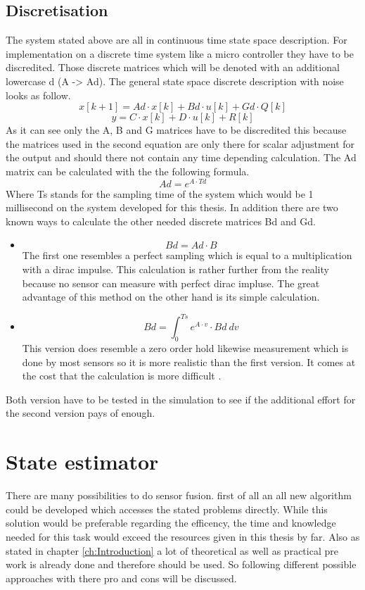   \subsection{Discretisation}
  The system stated above are all in continuous time state space description. 
  For implementation on a discrete time system like a micro controller they have to be discredited.
  Those discrete matrices which will be denoted with an additional lowercase d (A -> Ad).
  The general state space discrete description with noise looks as follow.
  $$ x[k+1] = Ad\cdot x[k] + Bd\cdot u[k] + Gd\cdot Q[k] $$
  $$ y = C \cdot x[k] + D\cdot u[k] + R[k] $$
  As it can see only the A, B and G matrices have to be discredited this because 
  the matrices used in the second equation are only there for scalar adjustment for the output
  and should there not contain any time depending calculation.
  The Ad matrix can be calculated with the the following formula.
  $$ Ad = e^{A\cdot Td}$$
  Where Ts stands for the sampling time of the system which would be 1 millisecond on the system developed for this thesis.
  In addition there are two known ways to calculate the other needed discrete matrices Bd and Gd.
  \begin{itemize}
   \item $$ Bd = Ad \cdot B $$
	 The first one resembles a perfect sampling which is equal to a multiplication with a dirac impulse.
	 This calculation is rather further from the reality because no sensor can measure with perfect dirac impluse.
	 The great advantage of this method on the other hand is its simple calculation.
   \item $$ Bd = \int_0^{Ts} e^{A\cdot v}\cdot Bd \ dv $$
	 This version does resemble a zero order hold likewise measurement which is done by most sensors so it is more realistic than the first version.
	 It comes at the cost that the calculation is more difficult \cite{DavidWSchultz2004}.
  \end{itemize}

  Both version have to be tested in the simulation to see if the additional effort for the second version pays of enough.
  
  \section{State estimator}
  There are many possibilities to do sensor fusion. first of all an all new algorithm could be developed which accesses the 
  stated problems directly. While this solution would be preferable regarding the efficency, the 
  time and knowledge needed for this task would exceed the resources given in this thesis by far.
  Also as stated in chapter \ref{ch:Introduction} a lot of theoretical as well as practical pre work is
  already done and therefore should be used. 
  So following different possible approaches with there pro and cons will be discussed. 
  
